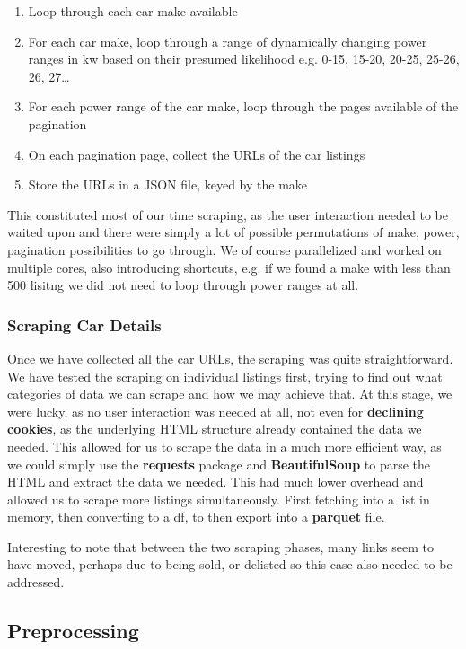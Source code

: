 \documentclass[12pt]{article}
\begin{document}
\begin{enumerate}
  \item Loop through each car make available
  \item For each car make, loop through a range of dynamically changing power ranges in kw based on their presumed likelihood e.g. 0-15, 15-20, 20-25, 25-26, 26, 27\dots
  \item For each power range of the car make, loop through the pages available of the pagination
  \item On each pagination page, collect the URLs of the car listings
  \item Store the URLs in a JSON file, keyed by the make
\end{enumerate}

This constituted most of our time scraping, as the user interaction needed to be waited upon and there were simply a lot of possible permutations of make, power, pagination possibilities to go through.
We of course parallelized and worked on multiple cores, also introducing shortcuts, e.g. if we found a make with less than 500 lisitng we did not need to loop through power ranges at all.

\subsubsection{Scraping Car Details}

Once we have collected all the car URLs, the scraping was quite straightforward. We have tested the scraping on individual listings first, trying to find out what categories of data we can scrape and how we may achieve that. At this stage, we were lucky, as no user interaction was needed at all, not even for \textbf{declining cookies}, as the underlying HTML structure already contained the data we needed.
This allowed for us to scrape the data in a much more efficient way, as we could simply use the \textbf{requests} package and \textbf{BeautifulSoup} to parse the HTML and extract the data we needed. This had much lower overhead and allowed us to scrape more listings simultaneously. First fetching into a list in memory, then converting to a df, to then export into a \textbf{parquet} file.

Interesting to note that between the two scraping phases, many links seem to have moved, perhaps due to being sold, or delisted so this case also needed to be addressed.

\subsection{Preprocessing}
\end{document}
